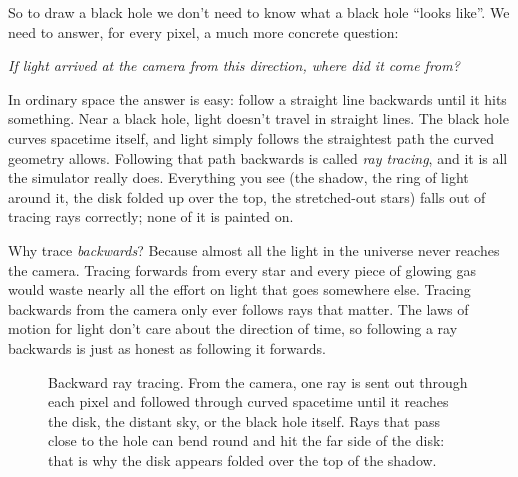 \documentclass[11pt,a4paper]{article}
\begin{document}
So to draw a black hole we don't need to know what a black hole ``looks like''. We need to
answer, for every pixel, a much more concrete question:
\begin{center}
\emph{If light arrived at the camera from this direction, where did it come from?}
\end{center}
In ordinary space the answer is easy: follow a straight line backwards until it hits
something. Near a black hole, light doesn't travel in straight lines. The black hole curves
spacetime itself, and light simply follows the straightest path the curved geometry
allows. Following that path backwards is called \emph{ray tracing}, and it is all the
simulator really does. Everything you see (the shadow, the ring of light around it, the
disk folded up over the top, the stretched-out stars) falls out of tracing rays correctly;
none of it is painted on.

Why trace \emph{backwards}? Because almost all the light in the universe never reaches the
camera. Tracing forwards from every star and every piece of glowing gas would waste nearly
all the effort on light that goes somewhere else. Tracing backwards from the camera only
ever follows rays that matter. The laws of motion for light don't care about the direction
of time, so following a ray backwards is just as honest as following it forwards.

\begin{figure}[h]
\centering
{}
\caption{Backward ray tracing. From the camera, one ray is sent out through each pixel and
followed through curved spacetime until it reaches the disk, the distant sky, or the black
hole itself. Rays that pass close to the hole can bend round and hit the far side of the
disk: that is why the disk appears folded over the top of the shadow.}
\end{figure}
\end{document}
